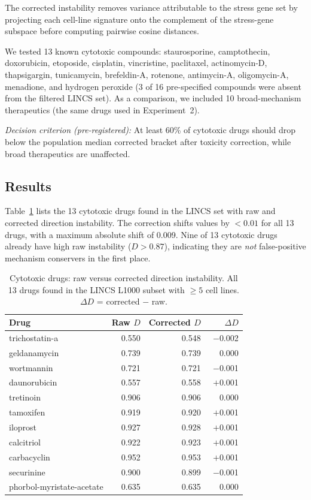 \documentclass[11pt]{article}
\begin{document}
The corrected instability removes variance attributable to the stress
gene set by projecting each cell-line signature onto the complement of
the stress-gene subspace before computing pairwise cosine distances.

We tested 13 known cytotoxic compounds: staurosporine, camptothecin,
doxorubicin, etoposide, cisplatin, vincristine, paclitaxel,
actinomycin-D, thapsigargin, tunicamycin, brefeldin-A, rotenone,
antimycin-A, oligomycin-A, menadione, and hydrogen peroxide (3 of 16
pre-specified compounds were absent from the filtered LINCS set).  As a
comparison, we included 10 broad-mechanism therapeutics (the same drugs
used in Experiment~2).

\emph{Decision criterion (pre-registered):} At least 60\% of cytotoxic
drugs should drop below the population median corrected bracket after
toxicity correction, while broad therapeutics are unaffected.

\subsection{Results}

Table~\ref{tab:h1_cytotoxic} lists the 13 cytotoxic drugs found in the
LINCS set with raw and corrected direction instability.  The correction
shifts values by $< 0.01$ for all 13 drugs, with a maximum absolute
shift of 0.009.  Nine of 13 cytotoxic drugs already have high raw
instability ($D > 0.87$), indicating they are \emph{not} false-positive
mechanism conservers in the first place.

\begin{table}[htbp]
\centering
\caption{Cytotoxic drugs: raw versus corrected direction instability.
All 13 drugs found in the LINCS L1000 subset with $\geq 5$ cell lines.
$\Delta D$ = corrected $-$ raw.}
\label{tab:h1_cytotoxic}
\begin{tabular}{@{}lrrr@{}}
\toprule
Drug & Raw $D$ & Corrected $D$ & $\Delta D$ \\
\midrule
trichostatin-a       & 0.550 & 0.548 & $-$0.002 \\
geldanamycin         & 0.739 & 0.739 & $\phantom{-}$0.000 \\
wortmannin           & 0.721 & 0.721 & $-$0.001 \\
daunorubicin         & 0.557 & 0.558 & $+$0.001 \\
tretinoin            & 0.906 & 0.906 & $\phantom{-}$0.000 \\
tamoxifen            & 0.919 & 0.920 & $+$0.001 \\
iloprost             & 0.927 & 0.928 & $+$0.001 \\
calcitriol           & 0.922 & 0.923 & $+$0.001 \\
carbacyclin          & 0.952 & 0.953 & $+$0.001 \\
securinine           & 0.900 & 0.899 & $-$0.001 \\
phorbol-myristate-acetate & 0.635 & 0.635 & $\phantom{-}$0.000 \\
\bottomrule
\end{tabular}
\end{table}
\end{document}
